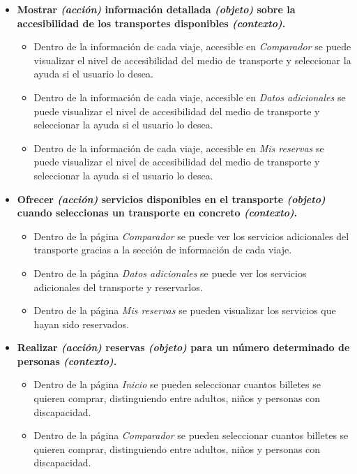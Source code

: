 \begin{itemize}
    \item \textbf{Mostrar \textit{(acción)} información detallada \textit{(objeto)} sobre la accesibilidad de los transportes 
        disponibles \textit{(contexto)}.}
        \begin{itemize}
            \item Dentro de la información de cada viaje, accesible en \textit{Comparador} se puede visualizar el nivel de accesibilidad del medio de
                transporte y seleccionar la ayuda si el usuario lo desea.
            \item Dentro de la información de cada viaje, accesible en \textit{Datos adicionales} se puede visualizar el nivel de accesibilidad del medio de
                transporte y seleccionar la ayuda si el usuario lo desea.
            \item Dentro de la información de cada viaje, accesible en \textit{Mis reservas} se puede visualizar el nivel de accesibilidad del medio de
                transporte y seleccionar la ayuda si el usuario lo desea.
        \end{itemize}
    
    \item \textbf{Ofrecer \textit{(acción)} servicios disponibles en el transporte \textit{(objeto)} cuando seleccionas un transporte
        en concreto \textit{(contexto)}.}
        \begin{itemize}
            \item Dentro de la página \textit{Comparador} se puede ver los servicios adicionales del transporte gracias a la sección
                de información de cada viaje.
            \item Dentro de la página \textit{Datos adicionales} se puede ver los servicios adicionales del transporte y reservarlos.
            \item Dentro de la página \textit{Mis reservas} se pueden visualizar los servicios que hayan sido reservados.
        \end{itemize}
    
    \item \textbf{Realizar \textit{(acción)} reservas \textit{(objeto)} para un número determinado de personas \textit{(contexto)}.}
        \begin{itemize}
            \item Dentro de la página \textit{Inicio} se pueden seleccionar cuantos billetes se
                quieren comprar, distinguiendo entre adultos, niños y personas con discapacidad.
            \item Dentro de la página \textit{Comparador} se pueden seleccionar cuantos billetes se
                quieren comprar, distinguiendo entre adultos, niños y personas con discapacidad.
        \end{itemize}


\end{itemize}
